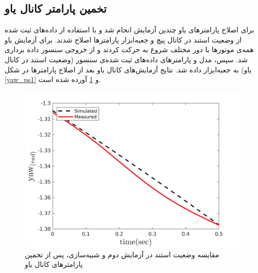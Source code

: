 \subsection{تخمین پارامتر کانال یاو}
برای اصلاح پارامترهای یاو چندین آزمایش انجام شد و با استفاده از داده‌های ثبت شده از وضعیت استند در کانال پیچ  و جعبه‌ابزار
پارامترها اصلاح شدند.
برای آزمایش یاو همه‌ی موتورها با دور مختلف شروع به حرکت کردند و از خروجی‌ سنسور داده برداری شد. سپس، مدل و پارامترهای داده‌های ثبت شده‌ی سنسور (وضعیت استند در کانال یاو) به جعبه‌ابزار
داده شد. نتایج آزمایش‌های کانال یاو بعد از اصلاح پارامترها در شکل
\ref{yaw_ps1} و \ref{yaw_ps2}
آورده شده است.


\begin{figure}[H]
	\includegraphics[width=12cm]{../Figures/RCP/yaw_parameter_estimation/RCP_yaw_S2.png}
	\centering
	\caption{مقايسه  وضعیت استند در  آزمايش دوم و شبیه‌سازی، پس از تخمین پارامترهای کانال یاو}
	\label{yaw_ps2}
\end{figure}
